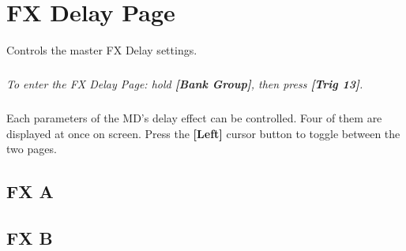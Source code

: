 \chapter{FX Delay Page}
Controls the master FX Delay settings.\\
\vspace{-16pt}
\vspace{-32pt}
\paragraph{}\textit{To enter the FX Delay Page: hold \textbf{[Bank Group]}, then press \textbf{[Trig 13]}.}
\vspace{-16pt}
\paragraph{}
\noindent Each parameters of the MD's delay effect can be controlled. Four of them are displayed at once on screen. Press the \textbf{[Left]} cursor button to toggle between the two pages.

\vspace{-4pt}
\section{FX A}
\vspace{-16pt}
\vspace{-25pt}
\vspace{-10pt}
\section{FX B}
\vspace{-16pt}
\vspace{-25pt}
\begin{figure}[h!]
\end{figure}
